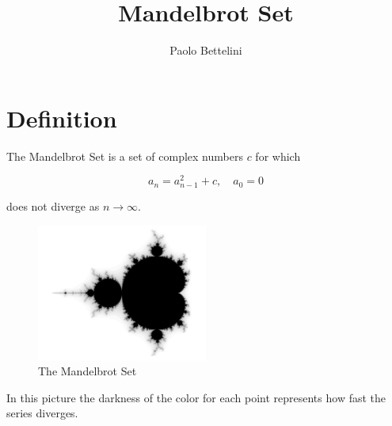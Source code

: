 \documentclass[a4paper]{article}
\title{Mandelbrot Set}
\author{Paolo Bettelini}
\date{}
\begin{document}
\maketitle
\tableofcontents
\pagebreak

\section{Definition}

The Mandelbrot Set is a set of complex numbers \(c\) for which

\[
    a_n = a_{n-1}^2 + c,\quad a_0=0
\]

does not diverge as \(n \to \infty\).

\begin{figure}[h]
    \centering
    \includegraphics[width=0.5\textwidth]{mandelbrot.jpg}
    \caption{The Mandelbrot Set}
    \label{fig:mesh1}
\end{figure}

In this picture the darkness of the color for each point
represents how fast the series diverges.

\pagebreak
\end{document}
